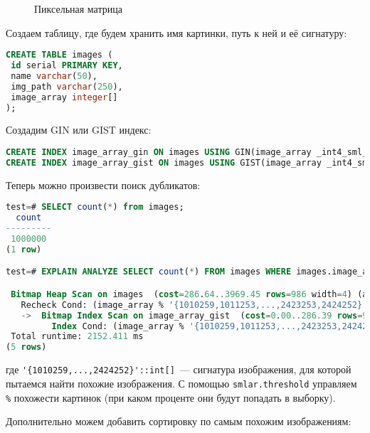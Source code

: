 \begin{figure}[ht!]
  \caption{Пиксельная матрица}
  \label{fig:smlar2}
\end{figure}

Создаем таблицу, где будем хранить имя картинки, путь к ней и её сигнатуру:

\begin{lstlisting}[language=SQL,label=lst:smlar8,caption=Таблица для изображений]
CREATE TABLE images (
 id serial PRIMARY KEY,
 name varchar(50),
 img_path varchar(250),
 image_array integer[]
);
\end{lstlisting}

Создадим GIN или GIST индекс:

\begin{lstlisting}[language=SQL,label=lst:smlar9,caption=Создание GIN или GIST индекса]
CREATE INDEX image_array_gin ON images USING GIN(image_array _int4_sml_ops);
CREATE INDEX image_array_gist ON images USING GIST(image_array _int4_sml_ops);
\end{lstlisting}

Теперь можно произвести поиск дубликатов:

\begin{lstlisting}[language=SQL,label=lst:smlar10,caption=Поиск дубликатов]
test=# SELECT count(*) from images;
  count
---------
 1000000
(1 row)

test=# EXPLAIN ANALYZE SELECT count(*) FROM images WHERE images.image_array % '{1010259,1011253,...,2423253,2424252}'::int[];

 Bitmap Heap Scan on images  (cost=286.64..3969.45 rows=986 width=4) (actual time=504.312..2047.533 rows=200000 loops=1)
   Recheck Cond: (image_array % '{1010259,1011253,...,2423253,2424252}'::integer[])
   ->  Bitmap Index Scan on image_array_gist  (cost=0.00..286.39 rows=986 width=0) (actual time=446.109..446.109 rows=200000 loops=1)
         Index Cond: (image_array % '{1010259,1011253,...,2423253,2424252}'::integer[])
 Total runtime: 2152.411 ms
(5 rows)
\end{lstlisting}

где \lstinline!'{1010259,...,2424252}'::int[]!~--- сигнатура изображения, для которой пытаемся найти похожие изображения. С помощью \lstinline!smlar.threshold! управляем \lstinline!%! похожести картинок (при каком проценте они будут попадать в выборку).

Дополнительно можем добавить сортировку по самым похожим изображениям:

